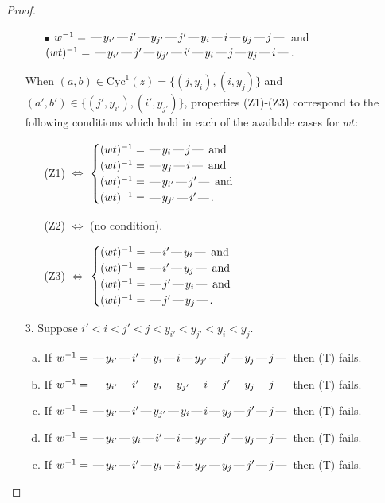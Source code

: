 \documentclass[10pt]{article}
\theoremstyle{definition}
\theoremstyle{definition}
\def\dash{\text{\hspace{0.5mm}---\hspace{0.5mm}}}
\def\Cyc{\mathrm{Cyc}}
\begin{document}
\begin{proof}
\begin{enumerate}
\begin{enumerate}
\item[$\bullet$] $w^{-1} = \dash y_{i'}\dash i'\dash y_{j'}\dash j'\dash y_i\dash i\dash y_j\dash j\dash $ and $(wt)^{-1} = \dash y_{i'}\dash j'\dash y_{j'}\dash i'\dash y_i\dash j\dash y_j\dash i\dash $.
\end{enumerate}
When $(a,b)\in\Cyc^1(z)=\{(j,y_i),(i,y_j)\}$ and $(a',b')\in\{(j',y_{i'}),(i',y_{j'})\}$,
properties (Z1)-(Z3) correspond to the following conditions which
hold in each of the available cases for $wt$:
\begin{enumerate}
\item[](Z1) $\Leftrightarrow$ $\begin{cases}\text{$(wt)^{-1} = \dash y_i \dash j \dash$}\text{ and }\\
\text{$(wt)^{-1} = \dash y_j \dash i \dash$}\text{ and }\\
\text{$(wt)^{-1} = \dash y_{i'} \dash j' \dash$}\text{ and }\\
\text{$(wt)^{-1} = \dash y_{j'} \dash i' \dash$}.\end{cases}$
\item[](Z2) $\Leftrightarrow$ (no condition).
\item[](Z3) $\Leftrightarrow$ $\begin{cases}\text{$(wt)^{-1} = \dash i' \dash y_i \dash$}\text{ and }\\
\text{$(wt)^{-1} = \dash i' \dash y_j \dash$}\text{ and }\\
\text{$(wt)^{-1} = \dash j' \dash y_i \dash$}\text{ and }\\
\text{$(wt)^{-1} = \dash j' \dash y_j \dash$}.\end{cases}$
\end{enumerate}
\item[$3$.] Suppose $i' < i < j' < j < y_{i'} < y_{j'} < y_i < y_j$.
\begin{enumerate}[(a)]
\item If $w^{-1} = \dash y_{i'}\dash i'\dash y_i\dash i\dash y_{j'}\dash j'\dash y_j\dash j\dash $ then (T) fails.
\item If $w^{-1} = \dash y_{i'}\dash i'\dash y_i\dash y_{j'}\dash i\dash j'\dash y_j\dash j\dash $ then (T) fails.
\item If $w^{-1} = \dash y_{i'}\dash i'\dash y_{j'}\dash y_i\dash i\dash y_j\dash j'\dash j\dash $ then (T) fails.
\item If $w^{-1} = \dash y_{i'}\dash y_i\dash i'\dash i\dash y_{j'}\dash j'\dash y_j\dash j\dash $ then (T) fails.
\item If $w^{-1} = \dash y_{i'}\dash i'\dash y_i\dash i\dash y_{j'}\dash y_j\dash j'\dash j\dash $ then (T) fails.

\end{enumerate}
\end{enumerate}
\end{proof}
\end{document}

